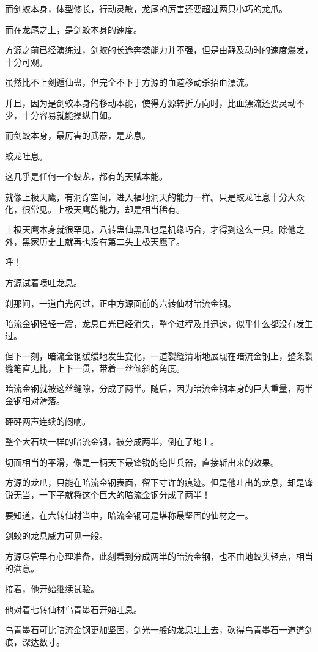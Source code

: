 \begin{this_body}
而剑蛟本身，体型修长，行动灵敏，龙尾的厉害还要超过两只小巧的龙爪。

而在龙尾之上，是剑蛟本身的速度。

方源之前已经演练过，剑蛟的长途奔袭能力并不强，但是由静及动时的速度爆发，十分可观。

虽然比不上剑遁仙蛊，但完全不下于方源的血道移动杀招血漂流。

并且，因为是剑蛟本身的移动本能，使得方源转折方向时，比血漂流还要灵动不少，十分容易就能操纵自如。

而剑蛟本身，最厉害的武器，是龙息。

蛟龙吐息。

这几乎是任何一个蛟龙，都有的天赋本能。

就像上极天鹰，有洞穿空间，进入福地洞天的能力一样。只是蛟龙吐息十分大众化，很常见。上极天鹰的能力，却是相当稀有。

上极天鹰本身就很罕见，八转蛊仙黑凡也是机缘巧合，才得到这么一只。除他之外，黑家历史上就再也没有第二头上极天鹰了。

呼！

方源试着喷吐龙息。

刹那间，一道白光闪过，正中方源面前的六转仙材暗流金钢。

暗流金钢轻轻一震，龙息白光已经消失，整个过程及其迅速，似乎什么都没有发生过。

但下一刻，暗流金钢缓缓地发生变化，一道裂缝清晰地展现在暗流金钢上，整条裂缝笔直无比，上下一贯，带着一丝倾斜的角度。

暗流金钢就被这丝缝隙，分成了两半。随后，因为暗流金钢本身的巨大重量，两半金钢相对滑落。

砰砰两声连续的闷响。

整个大石块一样的暗流金钢，被分成两半，倒在了地上。

切面相当的平滑，像是一柄天下最锋锐的绝世兵器，直接斩出来的效果。

方源的龙爪，只能在暗流金钢表面，留下寸许的痕迹。但是他吐出的龙息，却是锋锐无当，一下子就将这个巨大的暗流金钢分成了两半！

要知道，在六转仙材当中，暗流金钢可是堪称最坚固的仙材之一。

剑蛟的龙息威力可见一般。

方源尽管早有心理准备，此刻看到分成两半的暗流金钢，也不由地蛟头轻点，相当的满意。

接着，他开始继续试验。

他对着七转仙材乌青墨石开始吐息。

乌青墨石可比暗流金钢更加坚固，剑光一般的龙息吐上去，砍得乌青墨石一道道剑痕，深达数寸。


\end{this_body}
